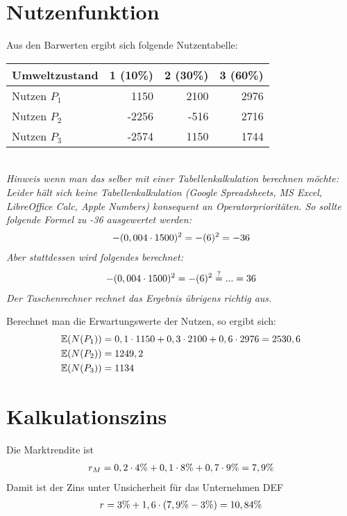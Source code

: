 \documentclass{article}
\newcommand{\E}{\mathbb{E}}
\begin{document}
	\section*{Nutzenfunktion}
	Aus den Barwerten ergibt sich folgende Nutzentabelle:
	\begin{center}
		\begin{tabular}{l|r|r|r}
			Umweltzustand & 1 (10\%) & 2 (30\%) & 3 (60\%) \\
			\hline
			Nutzen $P_1$ & 1150 & 2100 & 2976 \\
			\hline
			Nutzen $P_2$ & -2256 & -516 & 2716 \\
			\hline
			Nutzen $P_3$ & -2574 & 1150 & 1744
		\end{tabular} \\
		\textit{Hinweis wenn man das selber mit einer Tabellenkalkulation berechnen möchte: Leider hält sich keine Tabellenkalkulation (Google Spreadsheets, MS Excel, LibreOffice Calc, Apple Numbers) konsequent an Operatorprioritäten. So sollte folgende Formel zu -36 ausgewertet werden:
		\begin{align}
			-(0,004\cdot 1500)^2 = -(6)^2 = -36 \notag
		\end{align}
		Aber stattdessen wird folgendes berechnet:
		\begin{align}
			-(0,004\cdot 1500)^2 = -(6)^2 \overset{?}{=} ... = 36 \notag
		\end{align}
		Der Taschenrechner rechnet das Ergebnis übrigens richtig aus.}
	\end{center}
	Berechnet man die Erwartungswerte der Nutzen, so ergibt sich:
	\begin{align}
		\E(N(P_1)) &= 0,1\cdot 1150 + 0,3\cdot 2100 + 0,6\cdot 2976 = 2530,6 \notag \\
		\E(N(P_2)) &= 1249,2 \notag \\
		\E(N(P_3)) &= 1134 \notag
	\end{align}
	
	\section*{Kalkulationszins}
	Die Marktrendite ist
	\begin{align}
		r_M = 0,2\cdot 4\% + 0,1\cdot 8\% + 0,7\cdot 9\% = 7,9\% \notag
	\end{align}
	Damit ist der Zins unter Unsicherheit für das Unternehmen DEF
	\begin{align}
		r = 3\% + 1,6\cdot (7,9\% - 3\%) = 10,84\% \notag
	\end{align}
\end{document}
